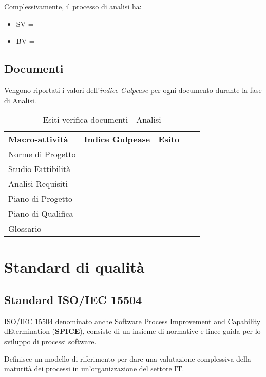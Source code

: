 		Complessivamente, il processo di analisi ha:
		\begin{itemize}
			\item SV = 
			\item BV = 
		\end{itemize}
	\newpage
	
	\subsection{Documenti} \label{App:AppendixB}
	
		Vengono riportati i valori dell’\textit{indice Gulpease} per ogni documento durante la fase di Analisi. 
		
		\begin{table}[!ht]
			\centering
				\begin{tabular}{|l|l|l|ll}
					\cline{1-3}
					 \textbf{Macro-attività}  & \textbf{Indice Gulpease}  & \textbf{Esito}  &  \\ \cline{1-3}
					 Norme di Progetto  &  &  &  \\ \cline{1-3}
					 Studio Fattibilità &  &  &  \\ \cline{1-3}
					 Analisi Requisiti &  &  &  \\ \cline{1-3}
					 Piano di Progetto &  &  &  \\ \cline{1-3}
					 Piano di Qualifica &  &  &  \\ \cline{1-3}
					 Glossario &  &  &  \\ \cline{1-3}
				\end{tabular}
				\caption{Esiti verifica documenti - Analisi}
		\end{table}
		\newpage
		
\section{Standard di qualità} \label{App:AppendixC}

	\subsection{Standard ISO/IEC 15504}

		ISO/IEC 15504 denominato anche Software Process Improvement and Capability dEtermination (\textbf{SPICE}), consiste di un insieme di normative e linee guida per lo sviluppo di processi software.
	
		Definisce un modello di riferimento per dare una valutazione complessiva della maturità dei processi in un'organizzazione del settore IT.\\
	
